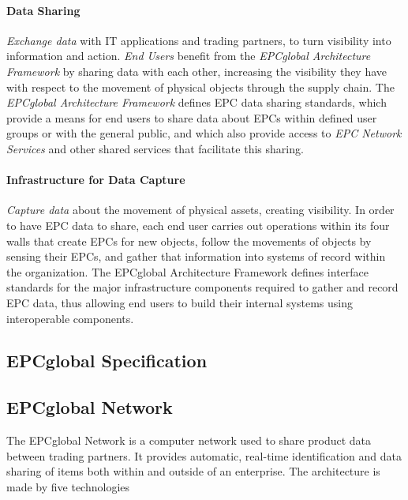 \paragraph{Data Sharing} 

\emph{Exchange data} with \gls{IT} applications and trading partners, to turn visibility into information and action.
\emph{End Users} benefit from the \emph{EPCglobal Architecture Framework} by sharing data with each other, increasing the visibility they have with respect to the movement of physical objects through the \gls{supply chain}. 
The \emph{EPCglobal Architecture Framework} defines \gls{EPC} data sharing standards, which provide a means for end users to share data about \gls{EPC}s within defined user groups or with the general public, and which also provide access to \emph{EPC Network Services} and other shared services that facilitate this sharing. 

\paragraph{Infrastructure for Data Capture} 

\emph{Capture data} about the movement of physical assets, creating visibility.
In order to have EPC data to share, each end user carries out operations within its four walls that create EPCs for new objects, follow the movements of objects by sensing their EPCs, and gather that information into systems of record within the organization. The EPCglobal Architecture Framework defines interface standards for the major infrastructure components required to gather and record EPC data, thus allowing end users to build their internal systems using interoperable components.

\subsection{EPCglobal Specification}


\subsection{EPCglobal Network}

The EPCglobal Network is a computer network used to share product data between trading partners. 
It provides automatic, real-time identification and data sharing of items both within and outside of an enterprise.
The architecture is made by five technologies


